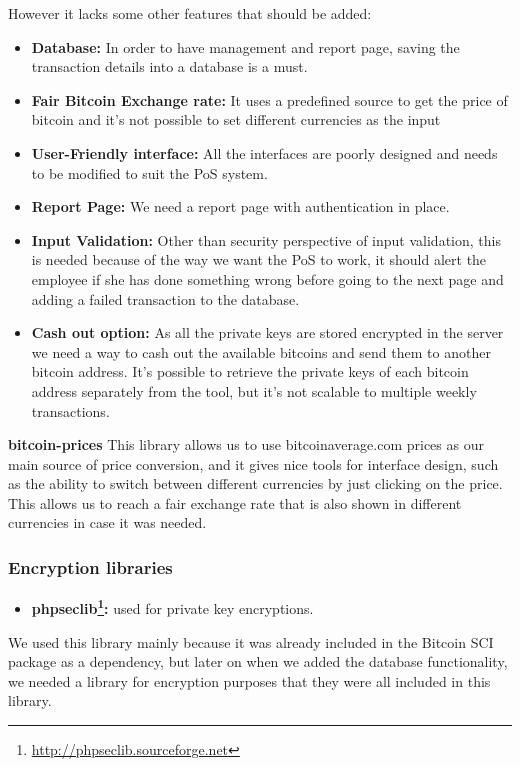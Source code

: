 However it lacks some other features that should be added:
\begin{itemize}

\item \textbf{Database: } In order to have management and report page, saving the transaction details into a database is a must.
\item \textbf{Fair Bitcoin Exchange rate: } It uses a predefined source to get the price of bitcoin and it's not possible to set different currencies as the input
\item \textbf{User-Friendly interface: } All the interfaces are poorly designed and needs to be modified to suit the PoS system.
\item \textbf {Report Page: } We need a report page with authentication in place.
\item \textbf {Input Validation: } Other than security perspective of input validation, this is needed because of the way we want the PoS to work, it should alert the employee if she has done something wrong before going to the next page and adding a failed transaction to the database.
\item \textbf {Cash out option: } As all the private keys are stored encrypted in the server we need a way to cash out the available bitcoins and send them to another bitcoin address. It's possible to retrieve the private keys of each bitcoin address separately from the tool, but it's not scalable to multiple weekly transactions.
\end{itemize}

\textbf{bitcoin-prices} This library allows us to use bitcoinaverage.com prices as our main source of price conversion, and it gives nice tools for interface design, such as the ability to switch between different currencies by just clicking on the price. This allows us to reach a fair exchange rate that is also shown in different currencies in case it was needed.

\subsubsection{Encryption libraries}
\begin{itemize}
\item \textbf{phpseclib\footnote{\url{http://phpseclib.sourceforge.net}}: } used for private key encryptions.
\end{itemize}

We used this library mainly because it was already included in the Bitcoin SCI package as a dependency, but later on when we added the database functionality, we needed a library for encryption purposes that they were all included in this library.

